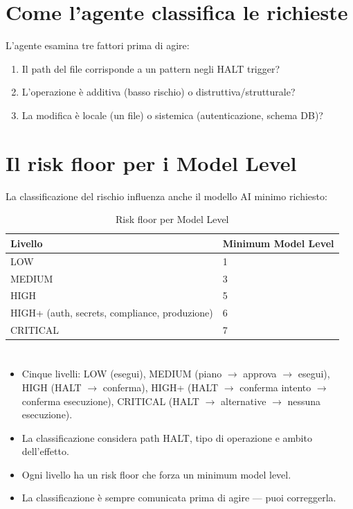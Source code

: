 
\section{Come l'agente classifica le richieste}
\label{sec:07-come-classifica}

L'agente esamina tre fattori prima di agire:

\begin{enumerate}
  \item Il path del file corrisponde a un pattern negli HALT trigger?
  \item L'operazione è additiva (basso rischio) o distruttiva/strutturale?
  \item La modifica è locale (un file) o sistemica (autenticazione, schema DB)?
\end{enumerate}

\section{Il risk floor per i Model Level}
\label{sec:07-risk-floor}

La classificazione del rischio influenza anche il modello AI minimo richiesto:

\begin{table}[htbp]
  \centering
  \begin{tabular}{ll}
    \toprule
    \textbf{Livello} & \textbf{Minimum Model Level} \\
    \midrule
    LOW & 1 \\
    MEDIUM & 3 \\
    HIGH & 5 \\
    HIGH+ (auth, secrets, compliance, produzione) & 6 \\
    CRITICAL & 7 \\
    \bottomrule
  \end{tabular}
  \caption{Risk floor per Model Level}
  \label{tab:07-risk-floor}
\end{table}

\section*{\LabelSummary}

\begin{itemize}
  \item Cinque livelli: LOW (esegui), MEDIUM (piano $\to$ approva $\to$ esegui), HIGH (HALT $\to$ conferma), HIGH+ (HALT $\to$ conferma intento $\to$ conferma esecuzione), CRITICAL (HALT $\to$ alternative $\to$ nessuna esecuzione).
  \item La classificazione considera path HALT, tipo di operazione e ambito dell'effetto.
  \item Ogni livello ha un risk floor che forza un minimum model level.
  \item La classificazione è sempre comunicata prima di agire --- puoi correggerla.
\end{itemize}
